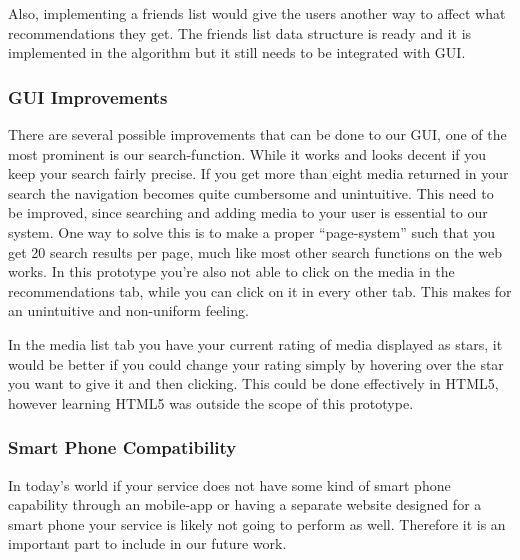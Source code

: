Also, implementing a friends list would give the users another way to affect what recommendations they get. The friends list data structure is ready and it is implemented in the algorithm but it still needs to be integrated with GUI.

\subsubsection{GUI Improvements}
There are several possible improvements that can be done to our GUI, one of the most prominent is our search-function. While it works and looks decent if you keep your search fairly precise. If you get more than eight media returned in your search the navigation becomes quite cumbersome and unintuitive. This need to be improved, since searching and adding media to your user is essential to our system. One way to solve this is to make a proper “page-system” such that you get 20 search results per page, much like most other search functions on the web works.
In this prototype you're also not able to click on the media in the recommendations tab, while you can click on it in every other tab. This makes for an unintuitive and non-uniform feeling.

In the media list tab you have your current rating of media displayed as stars, it would be better if you could change your rating simply by hovering over the star you want to give it and then clicking. This could be done effectively in HTML5, however learning HTML5 was outside the scope of this prototype.

\subsubsection{Smart Phone Compatibility}
In today's world if your service does not have some kind of smart phone capability through an mobile-app or having a separate website designed for a smart phone your service is likely not going to perform as well. Therefore it is an important part to include in our future work.

